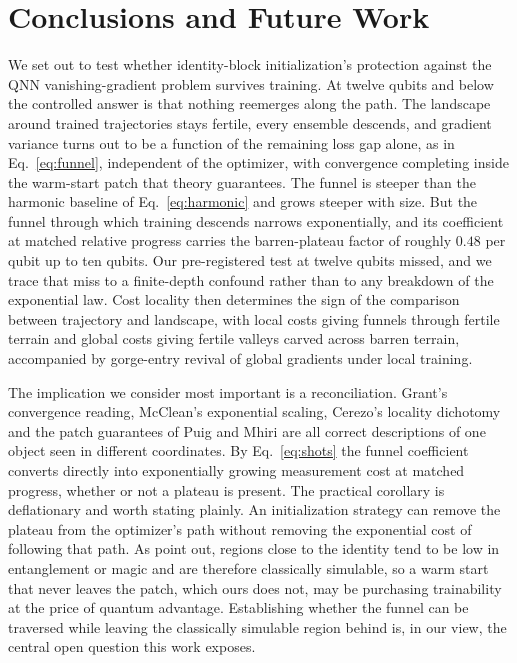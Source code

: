 \documentclass[conference]{IEEEtran}%
\begin{document}
\section{Conclusions and Future Work}
We set out to test whether identity-block initialization's protection against the QNN vanishing-gradient problem survives training. At twelve qubits and below the controlled answer is that nothing reemerges along the path. The landscape around trained trajectories stays fertile, every ensemble descends, and gradient variance turns out to be a function of the remaining loss gap alone, as in Eq.~\eqref{eq:funnel}, independent of the optimizer, with convergence completing inside the warm-start patch that theory guarantees. The funnel is steeper than the harmonic baseline of Eq.~\eqref{eq:harmonic} and grows steeper with size. But the funnel through which training descends narrows exponentially, and its coefficient at matched relative progress carries the barren-plateau factor of roughly $0.48$ per qubit up to ten qubits. Our pre-registered test at twelve qubits missed, and we trace that miss to a finite-depth confound rather than to any breakdown of the exponential law. Cost locality then determines the sign of the comparison between trajectory and landscape, with local costs giving funnels through fertile terrain and global costs giving fertile valleys carved across barren terrain, accompanied by gorge-entry revival of global gradients under local training.

The implication we consider most important is a reconciliation. Grant's convergence reading, McClean's exponential scaling, Cerezo's locality dichotomy and the patch guarantees of Puig and Mhiri are all correct descriptions of one object seen in different coordinates. By Eq.~\eqref{eq:shots} the funnel coefficient converts directly into exponentially growing measurement cost at matched progress, whether or not a plateau is present. The practical corollary is deflationary and worth stating plainly. An initialization strategy can remove the plateau from the optimizer's path without removing the exponential cost of following that path. As \cite{mhiri} point out, regions close to the identity tend to be low in entanglement or magic and are therefore classically simulable, so a warm start that never leaves the patch, which ours does not, may be purchasing trainability at the price of quantum advantage. Establishing whether the funnel can be traversed while leaving the classically simulable region behind is, in our view, the central open question this work exposes.
\end{document}
